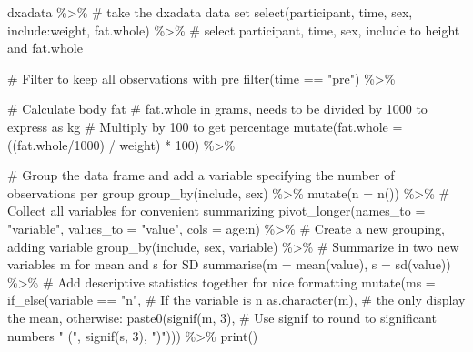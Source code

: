 \documentclass[
  11pt,
  letterpaper,
]{scrbook}
\newenvironment{Shaded}{\begin{snugshade}}{\end{snugshade}}
\newcommand{\AttributeTok}[1]{\textcolor[rgb]{0.40,0.45,0.13}{#1}}
\newcommand{\CommentTok}[1]{\textcolor[rgb]{0.37,0.37,0.37}{#1}}
\newcommand{\DecValTok}[1]{\textcolor[rgb]{0.68,0.00,0.00}{#1}}
\newcommand{\FunctionTok}[1]{\textcolor[rgb]{0.28,0.35,0.67}{#1}}
\newcommand{\NormalTok}[1]{\textcolor[rgb]{0.00,0.23,0.31}{#1}}
\newcommand{\SpecialCharTok}[1]{\textcolor[rgb]{0.37,0.37,0.37}{#1}}
\newcommand{\StringTok}[1]{\textcolor[rgb]{0.13,0.47,0.30}{#1}}
\begin{document}
\begin{Shaded}
\begin{Highlighting}[numbers=left,,]
\NormalTok{dxadata }\SpecialCharTok{\%\textgreater{}\%} \CommentTok{\# take the dxadata data set}
  \FunctionTok{select}\NormalTok{(participant, time, sex, include}\SpecialCharTok{:}\NormalTok{weight, fat.whole) }\SpecialCharTok{\%\textgreater{}\%} 
  \CommentTok{\# select participant, time, sex, include to height and fat.whole}
  
  \CommentTok{\# Filter to keep all observations with pre}
  \FunctionTok{filter}\NormalTok{(time }\SpecialCharTok{==} \StringTok{"pre"}\NormalTok{) }\SpecialCharTok{\%\textgreater{}\%}
  
  \CommentTok{\# Calculate body fat}
  \CommentTok{\# fat.whole in grams, needs to be divided by 1000 to express as kg}
  \CommentTok{\# Multiply by 100 to get percentage}
  \FunctionTok{mutate}\NormalTok{(}\AttributeTok{fat.whole =}\NormalTok{ ((fat.whole}\SpecialCharTok{/}\DecValTok{1000}\NormalTok{) }\SpecialCharTok{/}\NormalTok{ weight) }\SpecialCharTok{*} \DecValTok{100}\NormalTok{) }\SpecialCharTok{\%\textgreater{}\%}
  
  \CommentTok{\# Group the data frame and add a variable specifying the number of observations per group}
  \FunctionTok{group\_by}\NormalTok{(include, sex) }\SpecialCharTok{\%\textgreater{}\%}
  \FunctionTok{mutate}\NormalTok{(}\AttributeTok{n =} \FunctionTok{n}\NormalTok{()) }\SpecialCharTok{\%\textgreater{}\%}
  \CommentTok{\# Collect all variables for convenient summarizing}
  \FunctionTok{pivot\_longer}\NormalTok{(}\AttributeTok{names\_to =} \StringTok{"variable"}\NormalTok{, }
               \AttributeTok{values\_to =} \StringTok{"value"}\NormalTok{, }
               \AttributeTok{cols =}\NormalTok{ age}\SpecialCharTok{:}\NormalTok{n) }\SpecialCharTok{\%\textgreater{}\%}
  \CommentTok{\# Create a new grouping, adding variable}
  \FunctionTok{group\_by}\NormalTok{(include, sex, variable) }\SpecialCharTok{\%\textgreater{}\%}
  \CommentTok{\# Summarize in two new variables m for mean and s for SD}
  \FunctionTok{summarise}\NormalTok{(}\AttributeTok{m =} \FunctionTok{mean}\NormalTok{(value), }
            \AttributeTok{s =} \FunctionTok{sd}\NormalTok{(value)) }\SpecialCharTok{\%\textgreater{}\%}
  \CommentTok{\# Add descriptive statistics together for nice formatting}
  \FunctionTok{mutate}\NormalTok{(}\AttributeTok{ms =} \FunctionTok{if\_else}\NormalTok{(variable }\SpecialCharTok{==} \StringTok{"n"}\NormalTok{, }\CommentTok{\# If the variable is n}
                      \FunctionTok{as.character}\NormalTok{(m), }\CommentTok{\# the only display the mean, otherwise:}
                        \FunctionTok{paste0}\NormalTok{(}\FunctionTok{signif}\NormalTok{(m, }\DecValTok{3}\NormalTok{), }\CommentTok{\# Use signif to round to significant numbers}
                        \StringTok{" ("}\NormalTok{,}
                        \FunctionTok{signif}\NormalTok{(s, }\DecValTok{3}\NormalTok{), }
                        \StringTok{")"}\NormalTok{))) }\SpecialCharTok{\%\textgreater{}\%}
  \FunctionTok{print}\NormalTok{()}
\end{Highlighting}
\end{Shaded}
\end{document}
